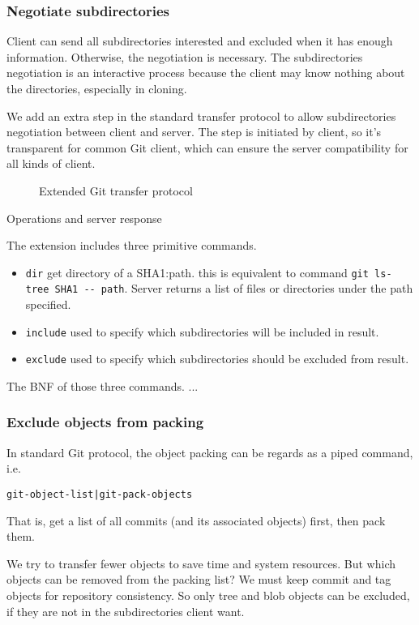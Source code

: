 \documentclass[preprint]{sigplanconf}
\begin{document}
\subsubsection{Negotiate subdirectories}
Client can send all subdirectories interested and excluded when it has enough information.
Otherwise, the negotiation is necessary.
The subdirectories negotiation is an interactive process because the client may know nothing about the directories, especially in cloning.

We add an extra step in the standard transfer protocol to allow subdirectories negotiation between client and server.
The step is initiated by client, so it's transparent for common Git client, which can ensure the server compatibility for all kinds of client.
\begin{figure}
  \centering
  
  \caption{Extended Git transfer protocol}
  \label{fig:git-proto-ext-seq}
\end{figure}

Operations and server response


The extension includes three primitive commands.
\begin{itemize}
  \item \verb|dir| get directory of a SHA1:path.
    this is equivalent to command \verb|git ls-tree SHA1 -- path|.
    Server returns a list of files or directories under the path specified.
  \item \verb|include| used to specify which subdirectories will be included in result.
  \item \verb|exclude| used to specify which subdirectories should be excluded from result.
\end{itemize}

The BNF of those three commands.
...

\subsubsection{Exclude objects from packing}
In standard Git protocol, the object packing can be regards as a piped command, i.e.
\begin{verbatim}
git-object-list|git-pack-objects
\end{verbatim}
That is, get a list of all commits (and its associated objects) first, then pack them.

We try to transfer fewer objects to save time and system resources.
But which objects can be removed from the packing list?
We must keep commit and tag objects for repository consistency.
So only tree and blob objects can be excluded, if they are not in the subdirectories client want.
\end{document}
